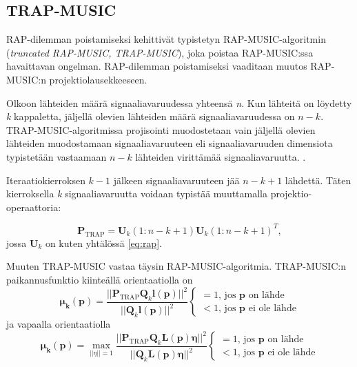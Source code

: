 \subsection{TRAP-MUSIC}
RAP-dilemman poistamiseksi \cite{Makela2018TruncatedLocalization} kehittivät typistetyn RAP-MUSIC-algoritmin (\textit{truncated RAP-MUSIC, TRAP-MUSIC}), joka poistaa RAP-MUSIC:ssa havaittavan ongelman. RAP-dilemman poistamiseksi vaaditaan muutos RAP-MUSIC:n projektiolausekkeeseen. 

Olkoon lähteiden määrä signaaliavaruudessa yhteensä \textit{n}. Kun lähteitä on löydetty \textit{k} kappaletta, jäljellä olevien lähteiden määrä signaaliavaruudessa on $n-k$. TRAP-MUSIC-algoritmissa projisointi muodostetaan vain jäljellä olevien lähteiden muodostamaan signaaliavaruuteen eli signaaliavaruuden dimensiota typistetään vastaamaan $n-k$ lähteiden virittämää signaaliavaruutta. \citep{Makela2018TruncatedLocalization}.

Iteraatiokierroksen $k-1$ jälkeen signaaliavaruuteen jää $n-k+1$ lähdettä. Täten kierroksella \textit{k} signaaliavaruutta voidaan typistää muuttamalla projektio-operaattoria:

\begin{equation}
    \mathbf{P}_{\text{TRAP}} = \mathbf{U}_k(1:n-k+1)\mathbf{U}_k(1:n-k+1)^T,
\end{equation}
jossa $\mathbf{U}_k$ on kuten yhtälössä \ref{eq:rap}.

Muuten TRAP-MUSIC vastaa täysin RAP-MUSIC-algoritmia. TRAP-MUSIC:n paikannusfunktio kiinteällä orientaatiolla on
\begin{equation}
    \mathbf{\mu_k(p)} = \frac{||\mathbf{P}_{\text{TRAP}}\mathbf{Q}_k\mathbf{l(p)}||^2}{||\mathbf{Q}_k\mathbf{l(p)}||^2}
    \begin{cases}
    =1\text{, jos $\mathbf{p}$ on lähde}\\
    <1\text{, jos $\mathbf{p}$ ei ole lähde}
     \end{cases}
     \label{eq:TRAPfix}
\end{equation}
ja vapaalla orientaatiolla
\begin{equation}
    \mathbf{\mu_k(p)} = \max_{||\eta||=1} \frac{||\mathbf{P}_{\text{TRAP}}\mathbf{Q}_k\mathbf{L(p)\eta}||^2}{||\mathbf{Q}_k\mathbf{L(p)\eta}||^2}
    \begin{cases}
    =1\text{, jos $\mathbf{p}$ on lähde}\\
    <1\text{, jos $\mathbf{p}$ ei ole lähde}
     \end{cases}
     \label{eq:TRAPfree}
\end{equation}